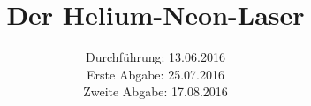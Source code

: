 

\subject{Versuch 61}
\title{Der Helium-Neon-Laser}
\date{Durchführung: 13.06.2016\\
      Erste Abgabe: 25.07.2016\\
      Zweite Abgabe: 17.08.2016}



\maketitle
\newpage







\printbibliography


